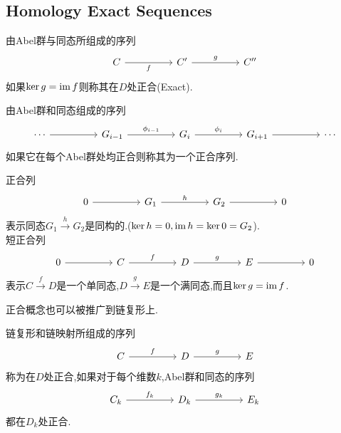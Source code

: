 \documentclass{article}
\begin{document}
\subsection{Homology Exact Sequences}
\begin{definition}
    由Abel群与同态所组成的序列
    \[\begin{tikzcd}
        C && {C'} && {C''}
        \arrow["f"', from=1-1, to=1-3]
        \arrow["g", from=1-3, to=1-5]
    \end{tikzcd}\]
    如果$\ker g = \operatorname{im} f$则称其在$D$处正合(Exact).
\end{definition}
由Abel群和同态组成的序列
\[\begin{tikzcd}
	\cdots && {G_{i-1}} && {G_i} && {G_{i+1}} && \cdots
	\arrow[from=1-1, to=1-3]
	\arrow["{\phi_{i-1}}", from=1-3, to=1-5]
	\arrow["{\phi_{i}}", from=1-5, to=1-7]
	\arrow[from=1-7, to=1-9]
\end{tikzcd}\]
如果它在每个Abel群处均正合则称其为一个正合序列.\\
\begin{example}
    正合列
    \[\begin{tikzcd}
        0 && {G_1} && {G_2} && 0
        \arrow[from=1-1, to=1-3]
        \arrow["h", from=1-3, to=1-5]
        \arrow[from=1-5, to=1-7]
    \end{tikzcd}\]
    表示同态$G_1 \xrightarrow{h} G_2$是同构的.($\ker h = 0,\operatorname{im} h = \ker 0 = G_2$).\\
    短正合列
    \[\begin{tikzcd}
        0 && C && D && E && 0
        \arrow[from=1-1, to=1-3]
        \arrow["g", from=1-5, to=1-7]
        \arrow["f", from=1-3, to=1-5]
        \arrow[from=1-7, to=1-9]
    \end{tikzcd}\]
    表示$C \xrightarrow{f} D$是一个单同态,$ D \xrightarrow{g} E$是一个满同态,而且$\ker g = \operatorname{im} f$.
\end{example}
正合概念也可以被推广到链复形上.
\begin{definition}
    链复形和链映射所组成的序列
    \[\begin{tikzcd}
        C && D && E
        \arrow["g", from=1-3, to=1-5]
        \arrow["f", from=1-1, to=1-3]
    \end{tikzcd}\]
    称为在$D$处正合,如果对于每个维数$k$,Abel群和同态的序列
    \[\begin{tikzcd}
        {C_k} && {D_k} && {E_k}
        \arrow["{g_k}", from=1-3, to=1-5]
        \arrow["{f_k}", from=1-1, to=1-3]
    \end{tikzcd}\]
    都在$D_k$处正合.
\end{definition}
\end{document}
